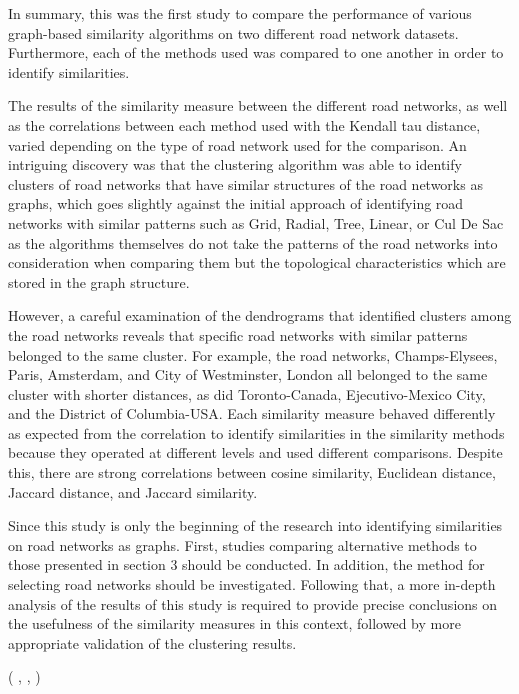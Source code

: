 
In summary, this was the first study to compare the performance of various graph-based similarity algorithms on two different road network datasets. Furthermore, each of the methods used was compared to one another in order to identify similarities.

The results of the similarity measure between the different road networks, as well as the correlations between each method used with the Kendall tau distance, varied depending on the type of road network used for the comparison. An intriguing discovery was that the clustering algorithm was able to identify clusters of road networks that have similar structures of the road networks as graphs, which goes slightly against the initial approach of identifying road networks with similar patterns such as Grid, Radial, Tree, Linear, or Cul De Sac as the algorithms themselves do not take the patterns of the road networks into consideration when comparing them but the topological characteristics which are stored in the graph structure.

However, a careful examination of the dendrograms that identified clusters among the road networks reveals that specific road networks with similar patterns belonged to the same cluster. For example, the road networks, Champs-Elysees, Paris, Amsterdam, and City of Westminster, London all belonged to the same cluster with shorter distances, as did Toronto-Canada, Ejecutivo-Mexico City, and the District of Columbia-USA. Each similarity measure behaved differently as expected from the correlation to identify similarities in the similarity methods because they operated at different levels and used different comparisons. Despite this, there are strong correlations between cosine similarity, Euclidean distance, Jaccard distance, and Jaccard similarity.

Since this study is only the beginning of the research into identifying similarities on road networks as graphs. First, studies comparing alternative methods to those presented in section 3 should be conducted. In addition, the method for selecting road networks should be investigated. Following that, a more in-depth analysis of the results of this study is required to provide precise conclusions on the usefulness of the similarity measures in this context, followed by more appropriate validation of the clustering results.

( \cite{Agryzkov:2012}, \cite{Barthelemy:2004}, \cite{Mheich:2018})

